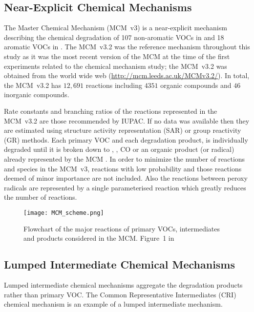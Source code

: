 \subsection{Near-Explicit Chemical Mechanisms} \label{ss:near_explicit}
The Master Chemical Mechanism (MCM~v3) is a near-explicit mechanism describing the chemical degradation of 107 non-aromatic VOCs in \citep{Saunders:2003} and 18 aromatic VOCs in \citep{Jenkin:2003}. 
The MCM~v3.2 was the reference mechanism throughout this study as it was the most recent version of the MCM at the time of the first experiments related to the chemical mechanism study; the MCM~v3.2 was obtained from the world wide web (\mbox{\url{http://mcm.leeds.ac.uk/MCMv3.2/}}).
In total, the MCM~v3.2 has $12,691$ reactions including $4351$ organic compounds and $46$ inorganic compounds. 

Rate constants and branching ratios of the reactions represented in the MCM~v3.2 are those recommended by IUPAC.
If no data was available then they are estimated using structure activity representation (SAR) or group reactivity (GR) methods.
Each primary VOC and each degradation product, is individually degraded until it is broken down to , , CO or an organic product (or radical) already represented by the MCM \citep{Jenkin:1997}. 
In order to minimize the number of reactions and species in the MCM~v3, reactions with low probability and those reactions deemed of minor importance are not included.
Also the reactions between peroxy radicals are represented by a single parameterised reaction which greatly reduces the number of reactions.
\begin{figure}%
    \begin{center}%
        \caption[Flowchart of VOC degradation represented by the MCM]{Flowchart of the major reactions of primary VOCs, intermediates and products considered in the MCM. Figure~1 in \citet{Saunders:2003}}%
        \texttt{[image: MCM\_scheme.png]}
        \label{f:MCM_scheme}%
    \end{center}%
\end{figure} %

\subsection{Lumped Intermediate Chemical Mechanisms} \label{ss:lumped_intermediate}
Lumped intermediate chemical mechanisms aggregate the degradation products rather than primary VOC.
The Common Representative Intermediates (CRI) chemical mechanism \citep{Jenkin:2008} is an example of a lumped intermediate mechanism.

